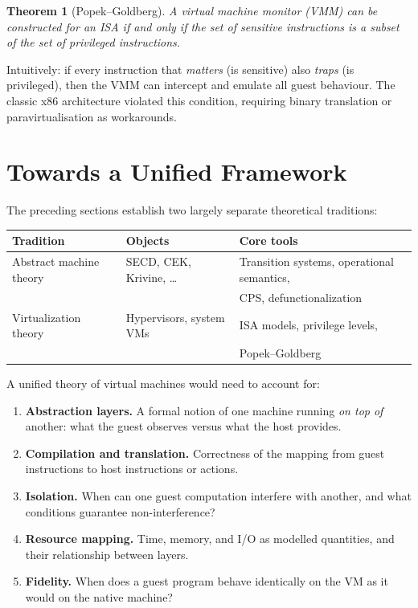 \documentclass[11pt, a4paper]{article}
\theoremstyle{definition}
\theoremstyle{plain}
\newtheorem{theorem}[definition]{Theorem}
\theoremstyle{remark}
\begin{document}
\begin{theorem}[Popek--Goldberg]
  A virtual machine monitor (VMM) can be constructed for an ISA if and only
  if the set of sensitive instructions is a subset of the set of privileged
  instructions.
\end{theorem}

Intuitively: if every instruction that \emph{matters} (is sensitive) also
\emph{traps} (is privileged), then the VMM can intercept and emulate all
guest behaviour. The classic x86 architecture violated this condition,
requiring binary translation or paravirtualisation as workarounds.


\section{Towards a Unified Framework}
\label{sec:unified}

The preceding sections establish two largely separate theoretical traditions:

\begin{center}
\small
\begin{tabular}{lll}
  \toprule
  Tradition & Objects & Core tools \\
  \midrule
  Abstract machine theory & SECD, CEK, Krivine, \ldots &
    Transition systems, operational semantics, \\
    & & CPS, defunctionalization \\[4pt]
  Virtualization theory & Hypervisors, system VMs &
    ISA models, privilege levels, \\
    & & Popek--Goldberg \\
  \bottomrule
\end{tabular}
\normalsize
\end{center}

A unified theory of virtual machines would need to account for:

\begin{enumerate}
  \item \textbf{Abstraction layers.} A formal notion of one machine running
        \emph{on top of} another: what the guest observes versus what the
        host provides.
  \item \textbf{Compilation and translation.} Correctness of the mapping
        from guest instructions to host instructions or actions.
  \item \textbf{Isolation.} When can one guest computation interfere with
        another, and what conditions guarantee non-interference?
  \item \textbf{Resource mapping.} Time, memory, and I/O as modelled
        quantities, and their relationship between layers.
  \item \textbf{Fidelity.} When does a guest program behave identically
        on the VM as it would on the native machine?
\end{enumerate}
\end{document}

